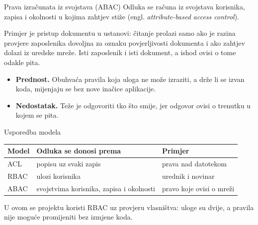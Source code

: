 \begin{frame}{Prava izračunata iz svojstava (ABAC)}
Odluka se računa iz svojstava korisnika, zapisa i okolnosti u kojima zahtjev stiže (engl. \emph{attribute-based access control}).

\vspace{1.1em}
Primjer je pristup dokumentu u ustanovi: čitanje prolazi samo ako je razina provjere zaposlenika dovoljna za oznaku povjerljivosti dokumenta i ako zahtjev dolazi iz uredske mreže. Isti zaposlenik i isti dokument, a ishod ovisi o tome odakle pita.

\pause
\vspace{1.1em}
\begin{itemize}
  \itemsep0.6em
  \item \textbf{Prednost.} Obuhvaća pravila koja uloga ne može izraziti, a drže li se izvan koda, mijenjaju se bez nove inačice aplikacije.
  \item \textbf{Nedostatak.} Teže je odgovoriti tko što smije, jer odgovor ovisi o trenutku u kojem se pita.
\end{itemize}
\end{frame}

\begin{frame}{Usporedba modela}
\begin{center}
{\small
\setlength{\tabcolsep}{8pt}
\renewcommand{\arraystretch}{1.4}
\begin{tabular}{@{}lll@{}}
  \toprule
  \textbf{Model} & \textbf{Odluka se donosi prema} & \textbf{Primjer} \\
  \midrule
  ACL  & popisu uz svaki zapis        & prava nad datotekom \\
  RBAC & ulozi korisnika              & urednik i novinar \\
  ABAC & svojstvima korisnika, zapisa i okolnosti & pravo koje ovisi o mreži \\
  \bottomrule
\end{tabular}
}
\end{center}

\vspace{0.9em}
U ovom se projektu koristi RBAC uz provjeru vlasništva: uloge su dvije, a pravila nije moguće promijeniti bez izmjene koda.
\end{frame}


